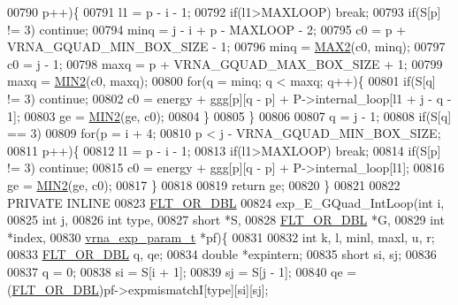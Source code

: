 \begin{DoxyCode}
00790       p++)\{
00791     l1    = p - i - 1;
00792     \textcolor{keywordflow}{if}(l1>MAXLOOP) \textcolor{keywordflow}{break};
00793     \textcolor{keywordflow}{if}(S[p] != 3) \textcolor{keywordflow}{continue};
00794     minq  = j - i + p - MAXLOOP - 2;
00795     c0    = p + VRNA\_GQUAD\_MIN\_BOX\_SIZE - 1;
00796     minq  = \hyperlink{group__utils_ga33297b3679c713b0c4d897cd0fe3b122}{MAX2}(c0, minq);
00797     c0    = j - 1;
00798     maxq  = p + VRNA\_GQUAD\_MAX\_BOX\_SIZE + 1;
00799     maxq  = \hyperlink{group__utils_gae0b9cd0ce090bd69b951aa73e8fa4f7d}{MIN2}(c0, maxq);
00800     \textcolor{keywordflow}{for}(q = minq; q < maxq; q++)\{
00801       \textcolor{keywordflow}{if}(S[q] != 3) \textcolor{keywordflow}{continue};
00802       c0  = energy + ggg[p][q - p] + P->internal\_loop[l1 + j - q - 1];
00803       ge   = \hyperlink{group__utils_gae0b9cd0ce090bd69b951aa73e8fa4f7d}{MIN2}(ge, c0);
00804     \}
00805   \}
00806 
00807   q = j - 1;
00808   \textcolor{keywordflow}{if}(S[q] == 3)
00809     \textcolor{keywordflow}{for}(p = i + 4;
00810         p < j - VRNA\_GQUAD\_MIN\_BOX\_SIZE;
00811         p++)\{
00812       l1    = p - i - 1;
00813       \textcolor{keywordflow}{if}(l1>MAXLOOP) \textcolor{keywordflow}{break};
00814       \textcolor{keywordflow}{if}(S[p] != 3) \textcolor{keywordflow}{continue};
00815       c0  = energy + ggg[p][q - p] + P->internal\_loop[l1];
00816       ge  = \hyperlink{group__utils_gae0b9cd0ce090bd69b951aa73e8fa4f7d}{MIN2}(ge, c0);
00817     \}
00818 
00819   \textcolor{keywordflow}{return} ge;
00820 \}
00821 
00822 PRIVATE INLINE
00823 \hyperlink{group__data__structures_ga31125aeace516926bf7f251f759b6126}{FLT\_OR\_DBL}
00824 exp\_E\_GQuad\_IntLoop(\textcolor{keywordtype}{int} i,
00825                     \textcolor{keywordtype}{int} j,
00826                     \textcolor{keywordtype}{int} type,
00827                     \textcolor{keywordtype}{short} *S,
00828                     \hyperlink{group__data__structures_ga31125aeace516926bf7f251f759b6126}{FLT\_OR\_DBL} *G,
00829                     \textcolor{keywordtype}{int} *index,
00830                     \hyperlink{group__energy__parameters_structvrna__exp__param__s}{vrna\_exp\_param\_t} *pf)\{
00831 
00832   \textcolor{keywordtype}{int}         k, l, minl, maxl, u, r;
00833   \hyperlink{group__data__structures_ga31125aeace516926bf7f251f759b6126}{FLT\_OR\_DBL}  q, qe;
00834   \textcolor{keywordtype}{double}      *expintern;
00835   \textcolor{keywordtype}{short}       si, sj;
00836 
00837   q         = 0;
00838   si        = S[i + 1];
00839   sj        = S[j - 1];
00840   qe        = (\hyperlink{group__data__structures_ga31125aeace516926bf7f251f759b6126}{FLT\_OR\_DBL})pf->expmismatchI[type][si][sj];

\end{DoxyCode}
